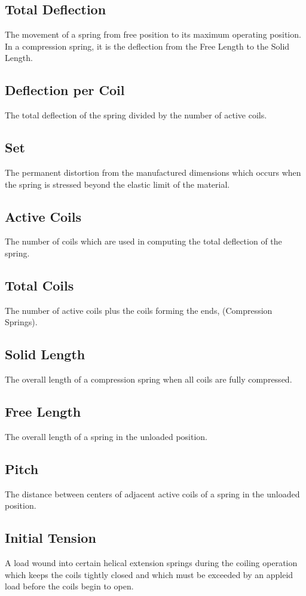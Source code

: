 \documentclass[10pt]{article}
\begin{document}
\subsection{Total Deflection}
The movement of a spring from free position to its maximum operating position. 
In a compression spring, it is the deflection from the Free
Length to the Solid Length.
\subsection{Deflection per Coil}
The total deflection of the spring divided by the number of active coils.
\subsection{Set}
The permanent distortion from the manufactured dimensions which occurs when the spring is stressed beyond the elastic limit of the material.
\subsection{Active Coils}
The number of coils which are used in computing the total deflection of the spring.
\subsection{Total Coils}
The number of active coils plus the coils forming the ends, (Compression Springs).
\subsection{Solid Length}
The overall length of a compression spring when all coils are fully compressed.
\subsection{Free Length}
The overall length of a spring in the unloaded position.
\subsection{Pitch}
The distance between centers of adjacent active coils of a spring in the unloaded position.
\subsection{Initial Tension}
A load wound into certain helical extension springs during the
coiling operation which keeps the coils tightly closed and which must be exceeded by an appleid load before the coils begin to open.
\end{document}
